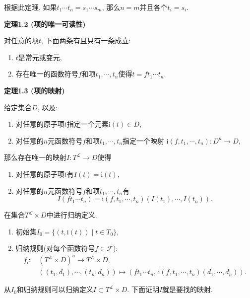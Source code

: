 \documentclass[UTF8]{ctexart}
\begin{document}
\vspace{10pt}

根据此定理, 如果$t_1\cdots t_n=s_1\cdots s_m$,
那么$n=m$并且各个$t_i=s_i$.





\newpage

\hypertarget{sec:定理1.2}{}
\noindent\textbf{定理1.2 (项的唯一可读性)}

对任意的项$t$, 下面两条有且只有一条成立:
\begin{enumerate}
    \item $t$是常元或变元,
    \item 存在唯一的函数符号$f$和项$t_1,\cdots,t_n$使得$t=ft_1\cdots t_n$.
\end{enumerate}

\vspace{10pt}

\hypertarget{sec:定理1.3}{}
\noindent\textbf{定理1.3 (项的映射)}

给定集合$D$, 以及:
\begin{enumerate}
    \item 对任意的原子项$t$指定一个元素$\mathrm{i}(t)\in D$,
    \item 对任意的$n$元函数符号$f$和项$t_1,\cdots,t_n$指定一个映射
    $\mathrm{i}(f,t_1,\cdots,t_n):D^n\to D$,
\end{enumerate}
那么存在唯一的映射$I:T^{\mathcal{L}}\to D$使得
\begin{enumerate}
    \item 对任意的原子项$t$有$I(t)=\mathrm{i}(t)$,
    \item 对任意的$n$元函数符号$f$和项$t_1,\cdots,t_n$有
    \[
        I(ft_1\cdots t_n)=\mathrm{i}(f,t_1,\cdots,t_n)(I(t_1),\cdots,I(t_n)).
    \]
\end{enumerate}


在集合$T^{\mathcal{L}}\times D$中进行归纳定义.
\begin{enumerate}
    \item 初始集$I_0=\{(t,\mathrm{i}(t))\mid t\in T_0\}$,
    \item 归纳规则(对每个函数符号$f\in\mathcal{F}$):
    \[\begin{aligned}
        f_{\mathrm{i}}:\,&(T^{\mathcal{L}}\times D)^n\to T^{\mathcal{L}}\times D,\\
        &((t_1,d_1),\cdots,(t_n,d_n))
        \mapsto(ft_1\cdots t_n,\,\mathrm{i}(f,t_1,\cdots,t_n)(d_1,\cdots,d_n)).
    \end{aligned}\]
\end{enumerate}
从$I_0$和归纳规则可以归纳定义$I\subset T^{\mathcal{L}}\times D$.
下面证明$I$就是要找的映射.
\end{document}
